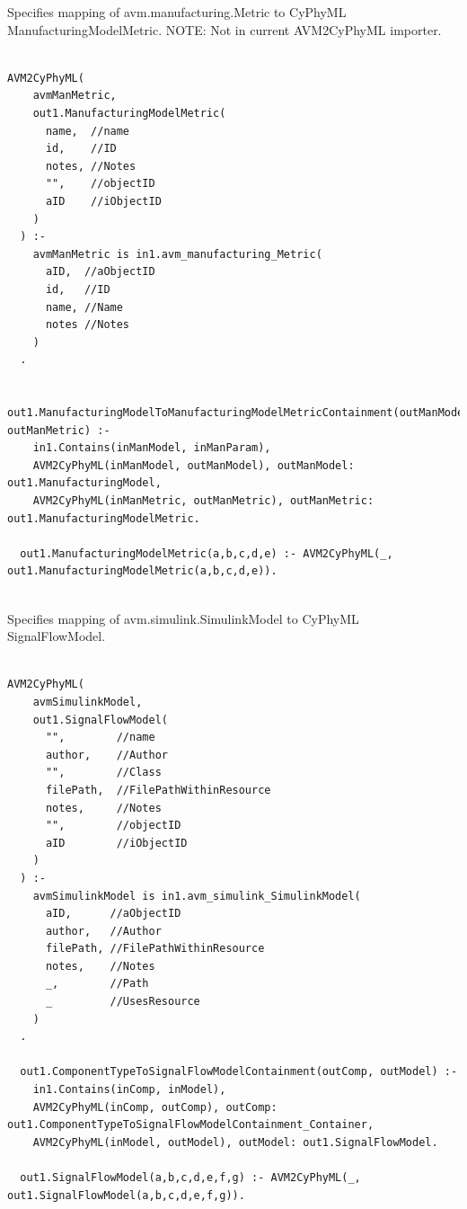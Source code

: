 Specifies mapping of avm.manufacturing.Metric to CyPhyML ManufacturingModelMetric. NOTE: Not in current AVM2CyPhyML importer.
\begin{lstlisting}

AVM2CyPhyML(
    avmManMetric,
    out1.ManufacturingModelMetric(
      name,  //name
      id,    //ID
      notes, //Notes
      "",    //objectID
      aID    //iObjectID
    )
  ) :-
    avmManMetric is in1.avm_manufacturing_Metric(
      aID,  //aObjectID
      id,   //ID
      name, //Name
      notes //Notes
    )
  .

  out1.ManufacturingModelToManufacturingModelMetricContainment(outManModel, outManMetric) :-
    in1.Contains(inManModel, inManParam),
    AVM2CyPhyML(inManModel, outManModel), outManModel: out1.ManufacturingModel,
    AVM2CyPhyML(inManMetric, outManMetric), outManMetric: out1.ManufacturingModelMetric.

  out1.ManufacturingModelMetric(a,b,c,d,e) :- AVM2CyPhyML(_, out1.ManufacturingModelMetric(a,b,c,d,e)).


\end{lstlisting}

Specifies mapping of avm.simulink.SimulinkModel to CyPhyML SignalFlowModel.
\begin{lstlisting}

AVM2CyPhyML(
    avmSimulinkModel,
    out1.SignalFlowModel(
      "",        //name
      author,    //Author
      "",        //Class
      filePath,  //FilePathWithinResource
      notes,     //Notes
      "",        //objectID
      aID        //iObjectID
    )
  ) :-
    avmSimulinkModel is in1.avm_simulink_SimulinkModel(
      aID,      //aObjectID
      author,   //Author
      filePath, //FilePathWithinResource
      notes,    //Notes
      _,        //Path
      _         //UsesResource
    )
  .

  out1.ComponentTypeToSignalFlowModelContainment(outComp, outModel) :-
    in1.Contains(inComp, inModel),
    AVM2CyPhyML(inComp, outComp), outComp: out1.ComponentTypeToSignalFlowModelContainment_Container,
    AVM2CyPhyML(inModel, outModel), outModel: out1.SignalFlowModel.

  out1.SignalFlowModel(a,b,c,d,e,f,g) :- AVM2CyPhyML(_, out1.SignalFlowModel(a,b,c,d,e,f,g)).


\end{lstlisting}


